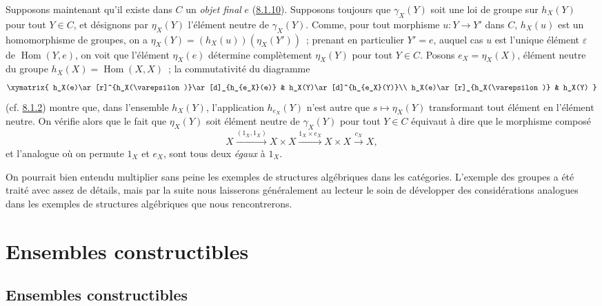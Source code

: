 \begin{env}[8.2.7]
\label{0.8.2.7-fr}
Supposons maintenant qu'il existe dans $C$ un \emph{objet final} $e$
(\hyperref[0.8.1.10-fr]{8.1.10}). Supposons toujours que $\gamma_X(Y)$ soit
une loi de groupe sur $h_X(Y)$ pour tout $Y\in C$, et désignons par
$\eta_X(Y)$ l'élément neutre de $\gamma_X(Y)$. Comme, pour tout morphisme
$u:Y\to Y'$ dans $C$, $h_X(u)$ est un homomorphisme de groupes, on a
$\eta_X(Y)=(h_X(u))(\eta_X(Y'))$~; prenant en particulier $Y'=e$, auquel cas
$u$ est l'unique élément $\varepsilon$ de $\operatorname{Hom}(Y,e)$, on voit
que l'élément $\eta_X(e)$ détermine complètement $\eta_X(Y)$ pour tout
$Y\in C$. Posons $e_X=\eta_X(X)$, élément neutre du groupe
$h_X(X)=\operatorname{Hom}(X,X)$~; la commutativité du diagramme
\[
  \xymatrix{
    h_X(e)\ar[r]^{h_X(\varepsilon)}\ar[d]_{h_{e_X}(e)} &
    h_X(Y)\ar[d]^{h_{e_X}(Y)}\\
    h_X(e)\ar[r]_{h_X(\varepsilon)} & h_X(Y)
  }
\]
(cf. \hyperref[0.8.1.2-fr]{8.1.2}) montre que, dans l'ensemble $h_X(Y)$,
l'application $h_{e_X}(Y)$ n'est autre que
$s\mapsto\eta_X(Y)$ transformant tout élément en l'élément neutre. On
vérifie alors que le fait que $\eta_X(Y)$ soit élément neutre de
$\gamma_X(Y)$ pour tout $Y\in C$ équivaut à dire que le morphisme composé
\[
  X\xrightarrow{(1_X,1_X)}X\times X
  \xrightarrow{1_X\times e_X}X\times X\xrightarrow{c_X}X,
\]
et l'analogue où on permute $1_X$ et $e_X$, sont tous deux \emph{égaux} à
$1_X$.
\end{env}

\begin{env}[8.2.8]
\label{0.8.2.8-fr}
On pourrait bien entendu multiplier sans peine les exemples de structures
algébriques dans les catégories. L'exemple des groupes a été traité avec
assez de détails, mais par la suite nous laisserons généralement au lecteur
le soin de développer des considérations analogues dans les exemples de
structures algébriques que nous rencontrerons.
\end{env}

\section{Ensembles constructibles}
\label{section:0.9-fr}

\subsection{Ensembles constructibles}
\label{subsection:0.9.1-fr}

